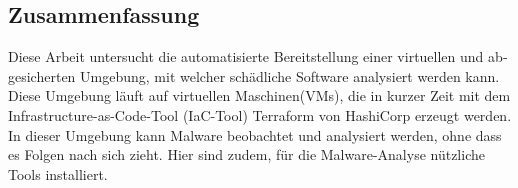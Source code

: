 \newpage
\begin{otherlanguage}{ngerman}
\section*{Zusammenfassung}
Diese Arbeit untersucht die automatisierte Bereitstellung einer virtuellen und abgesicherten Umgebung, mit welcher schädliche Software analysiert werden kann. Diese Umgebung läuft auf virtuellen Maschinen(VMs), die in kurzer Zeit mit dem Infrastructure-as-Code-Tool (IaC-Tool) Terraform von HashiCorp erzeugt werden. In dieser Umgebung kann Malware beobachtet und analysiert werden, ohne dass es Folgen nach sich zieht. Hier sind zudem, für die Malware-Analyse nützliche Tools installiert.
\end{otherlanguage}